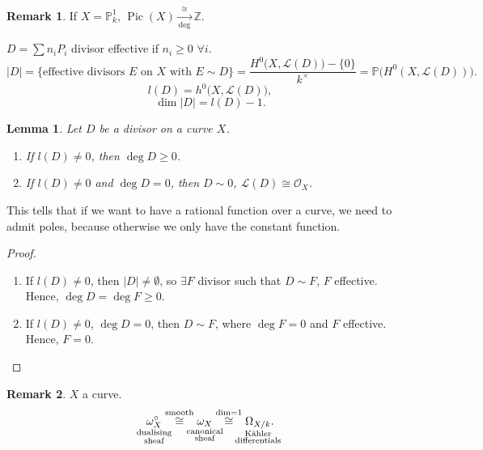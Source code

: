 \documentclass[12pt]{article}
\DeclareMathOperator{\Pic}{Pic}
\newtheorem*{lemma}{Lemma}
\theoremstyle{definition}
\newtheorem*{remark}{Remark}
\begin{document}
\begin{remark}
If $X=\mathbb P_k^1$, $\Pic(X)\xrightarrow[\deg]\cong\mathbb Z$.
\end{remark}

$D=\sum n_iP_i$ divisor effective if $n_i\geq0$ $\forall i$.
\[|D|=\{\text{effective divisors }E\text{ on }X\text{ with }E\sim D\}=\frac{H^0\big(X,\mathcal L(D)\big)-\{0\}}{k^\times}=\mathbb P\big(H^0(X,\mathcal L(D))\big).\]
\[l(D)=h^0\big(X,\mathcal L(D)\big),\]
\[\dim|D|=l(D)-1.\]

\begin{lemma}
Let $D$ be a divisor on a curve $X$.

\begin{enumerate}[label=\arabic*)]
\item If $l(D)\neq0$, then $\deg D\geq0$.

\item If $l(D)\neq0$ and $\deg D=0$, then $D\sim0$, $\mathcal L(D)\cong\mathcal O_X$.
\end{enumerate}
\end{lemma}

This tells that if we want to have a rational function over a curve, we need to admit poles, because otherwise we only have the constant function.

\begin{proof}
\begin{enumerate}[label=\arabic*)]
\item If $l(D)\neq0$, then $|D|\neq\emptyset$, so $\exists F$ divisor such that $D\sim F$, $F$ effective. Hence, $\deg D=\deg F\geq0$.

\item If $l(D)\neq0$, $\deg D=0$, then $D\sim F$, where $\deg F=0$ and $F$ effective. Hence, $F=0$.
\end{enumerate}
\end{proof}

\begin{remark}
$X$ a curve.
\[\underset{\mathclap{\substack{\text{dualising}\\\text{sheaf}}}}{\omega_X^\circ}\overset{\text{smooth}}\cong\underset{\mathclap{\substack{\text{canonical}\\\text{sheaf}}}}{\omega_X}\overset{\dim=1}\cong\underset{\mathclap{\substack{\text{K\"ahler}\\\text{differentials}}}}{\Omega_{X/k}}.\]
\end{remark}
\end{document}
